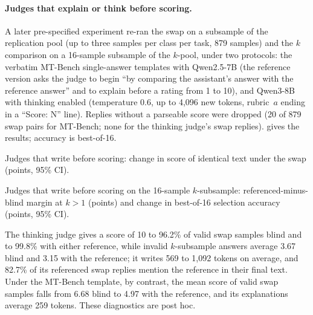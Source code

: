 \paragraph{Judges that explain or think before scoring.}
A later pre-specified experiment re-ran the swap on a subsample of the replication pool (up to three samples per class per task, 879 samples) and the $k$ comparison on a 16-sample subsample of the $k$-pool, under two protocols: the verbatim MT-Bench single-answer templates with Qwen2.5-7B (the reference version asks the judge to begin ``by comparing the assistant's answer with the reference answer'' and to explain before a rating from 1 to 10), and Qwen3-8B with thinking enabled (temperature 0.6, up to 4,096 new tokens, rubric~$a$ ending in a ``Score: N'' line). Replies without a parseable score were dropped (20 of 879 swap pairs for MT-Bench; none for the thinking judge's swap replies).  gives the results; accuracy is best-of-16.

\begin{table}[htbp]
\centering
\caption{Judges that write before scoring: change in score of identical text under the swap (points, 95\% CI).\pre}
\label{tab:r2b}
\footnotesize
\setlength{\tabcolsep}{3pt}
\begin{adjustbox}{max width=\linewidth}\end{adjustbox}

\end{table}

\begin{table}[htbp]
\centering
\caption{Judges that write before scoring on the 16-sample $k$-subsample: referenced-minus-blind margin at $k{>}1$ (points) and change in best-of-16 selection accuracy (points, 95\% CI).\pre}
\label{tab:r2b-k}
\footnotesize
\begin{adjustbox}{max width=\linewidth}\end{adjustbox}

\end{table}
The thinking judge gives a score of 10 to 96.2\% of valid swap samples blind and to 99.8\% with either reference, while invalid $k$-subsample answers average 3.67 blind and 3.15 with the reference; it writes 569 to 1,092 tokens on average, and 82.7\% of its referenced swap replies mention the reference in their final text. Under the MT-Bench template, by contrast, the mean score of valid swap samples falls from 6.68 blind to 4.97 with the reference, and its explanations average 259 tokens. These diagnostics are post hoc.

